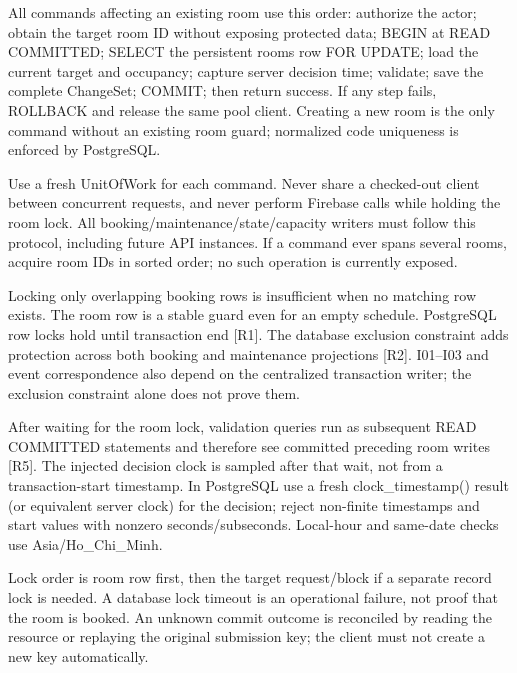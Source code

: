\vspace{2mm}

All commands affecting an existing room use this order: authorize the actor; obtain the target room ID without exposing protected data; BEGIN at READ COMMITTED; SELECT the persistent rooms row FOR UPDATE; load the current target and occupancy; capture server decision time; validate; save the complete ChangeSet; COMMIT; then return success. If any step fails, ROLLBACK and release the same pool client. Creating a new room is the only command without an existing room guard; normalized code uniqueness is enforced by PostgreSQL.\par

Use a fresh UnitOfWork for each command. Never share a checked-out client between concurrent requests, and never perform Firebase calls while holding the room lock. All booking/maintenance/state/capacity writers must follow this protocol, including future API instances. If a command ever spans several rooms, acquire room IDs in sorted order; no such operation is currently exposed.\par

Locking only overlapping booking rows is insufficient when no matching row exists. The room row is a stable guard even for an empty schedule. PostgreSQL row locks hold until transaction end [R1]. The database exclusion constraint adds protection across both booking and maintenance projections [R2]. I01–I03 and event correspondence also depend on the centralized transaction writer; the exclusion constraint alone does not prove them.\par

After waiting for the room lock, validation queries run as subsequent READ COMMITTED statements and therefore see committed preceding room writes [R5]. The injected decision clock is sampled after that wait, not from a transaction-start timestamp. In PostgreSQL use a fresh clock\_timestamp() result (or equivalent server clock) for the decision; reject non-finite timestamps and start values with nonzero seconds/subseconds. Local-hour and same-date checks use Asia/Ho\_Chi\_Minh.\par

Lock order is room row first, then the target request/block if a separate record lock is needed. A database lock timeout is an operational failure, not proof that the room is booked. An unknown commit outcome is reconciled by reading the resource or replaying the original submission key; the client must not create a new key automatically.\par

